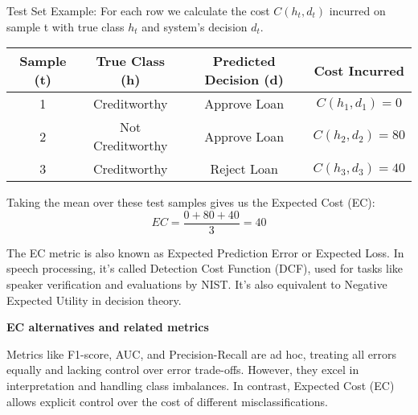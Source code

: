 Test Set Example: For each row we calculate the cost $C(h_t, d_t)$ incurred on sample t with true class $h_t$ and system’s decision $d_t$.

\begin{center}
\begin{tabular}{|c|c|c|c|}
\hline
Sample (t)& True Class (h) & Predicted Decision (d) & Cost Incurred \\
\hline
1 & Creditworthy & Approve Loan & $C(h_1, d_1) = 0$ \\
\hline
2 & Not Creditworthy & Approve Loan & $C(h_2, d_2) = 80$ \\
\hline
3 & Creditworthy & Reject Loan & $C(h_3, d_3) = 40$ \\
\hline
\end{tabular}
\end{center}

Taking the mean over these test samples gives us the Expected Cost (EC):
\[
EC = \frac{0 + 80 + 40}{3} = 40
\]

{
    The EC metric is also known as Expected Prediction Error or Expected Loss. In speech processing, it’s called Detection Cost Function (DCF), used for tasks like speaker verification and evaluations by NIST. It's also equivalent to Negative Expected Utility in decision theory.
}

\textbf{EC alternatives and related metrics}

Metrics like F1-score, AUC, and Precision-Recall are ad hoc, treating all errors equally and lacking control over error trade-offs. However, they excel in interpretation and handling class imbalances. In contrast, Expected Cost (EC) allows explicit control over the cost of different misclassifications.
